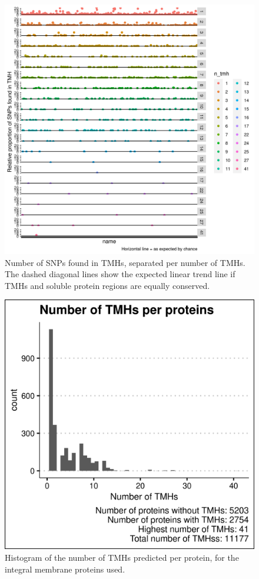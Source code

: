 \begin{figure}[!htbp]
  \includegraphics[width=\textwidth]{ncbi_peregrine_results/fig_n_snps_found_and_expected_per_n_tmhs.png}
  \caption{
    Number of SNPs found in TMHs,
    separated per number of TMHs.
    The dashed diagonal lines show the expected linear trend line
    if TMHs and soluble protein regions are equally conserved.
  }
  \label{fig:n_snps_found_and_expected_per_n_tmhs}
\end{figure}

\begin{figure}[!htbp]
  \includegraphics[width=\textwidth]{ncbi_peregrine_results/fig_n_tmhs_per_protein.png}
  \caption{
    Histogram of the number of TMHs predicted per protein,
    for the integral membrane proteins used.
  }
  \label{fig:n_tmhs_per_protein}
\end{figure}

